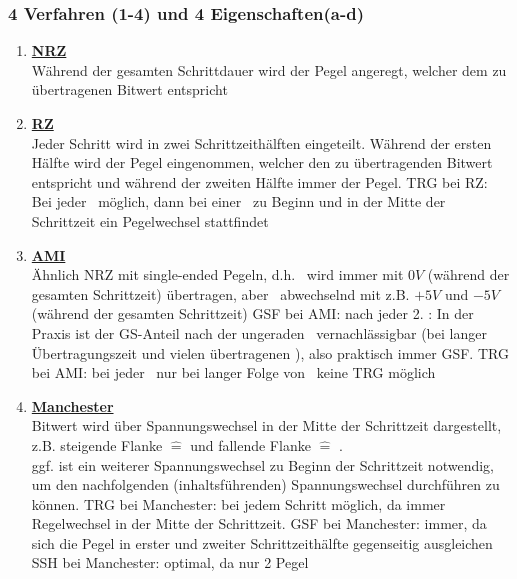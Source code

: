 \documentclass[10pt,a4paper]{scrartcl}
\begin{document}
\subsubsection*{4 Verfahren (1-4) und 4 Eigenschaften(a-d)}
\begin{enumerate}
	\item \textbf{\underline{\acf{NRZ}}}\\[0.5em]
	Während der gesamten Schrittdauer wird der Pegel angeregt, welcher dem zu übertragenen Bitwert entspricht
	\item \textbf{\underline{\acf{RZ}}}\\[0.5em]
	Jeder Schritt wird in zwei Schrittzeithälften eingeteilt. Während der ersten Hälfte wird der Pegel eingenommen, welcher den zu übertragenden Bitwert entspricht und während der zweiten Hälfte immer der \grqq\-Pegel.
	\subitem \ac{TRG} bei \ac{RZ}: Bei jeder \grqq\ möglich, dann bei einer \grqq\ zu Beginn und in der Mitte der Schrittzeit ein Pegelwechsel stattfindet
	\item \textbf{\underline{\acf{AMI}}} \\[0.5em]
	Ähnlich \ac{NRZ} mit single-ended Pegeln, d.h. \grqq\ wird immer mit $0V$ (während der gesamten Schrittzeit) übertragen, aber \grqq\ abwechselnd mit z.B. $+5V$ und $-5V$ (während der gesamten Schrittzeit)
	\subitem \ac{GSF} bei \ac{AMI}: nach jeder 2. \grqq: In der Praxis ist der GS-Anteil nach der ungeraden \grqq\ vernachlässigbar (bei langer Übertragungszeit und vielen übertragenen \grqq), also praktisch immer \ac{GSF}.
	\subitem \ac{TRG} bei \ac{AMI}: bei jeder \grqq\ nur bei langer Folge von \grqq\ keine \ac{TRG} möglich
	\item \textbf{\underline{Manchester}}\\
	Bitwert wird über Spannungswechsel in der Mitte der Schrittzeit dargestellt, z.B. steigende Flanke $\hat{=}$ \grqq{} und fallende Flanke $\hat{=}$ \grqq.\\
	ggf. ist ein weiterer Spannungswechsel zu Beginn der Schrittzeit notwendig, um den nachfolgenden (inhaltsführenden) Spannungswechsel durchführen zu können.
	\subitem \ac{TRG} bei Manchester: bei jedem Schritt möglich, da immer Regelwechsel in der Mitte der Schrittzeit.
	\subitem \ac{GSF} bei Manchester: immer, da sich die Pegel in erster und zweiter Schrittzeithälfte gegenseitig ausgleichen
	\subitem \ac{SSH} bei Manchester: optimal, da \glqq nur\grqq{} 2 Pegel
\end{enumerate}
\end{document}
